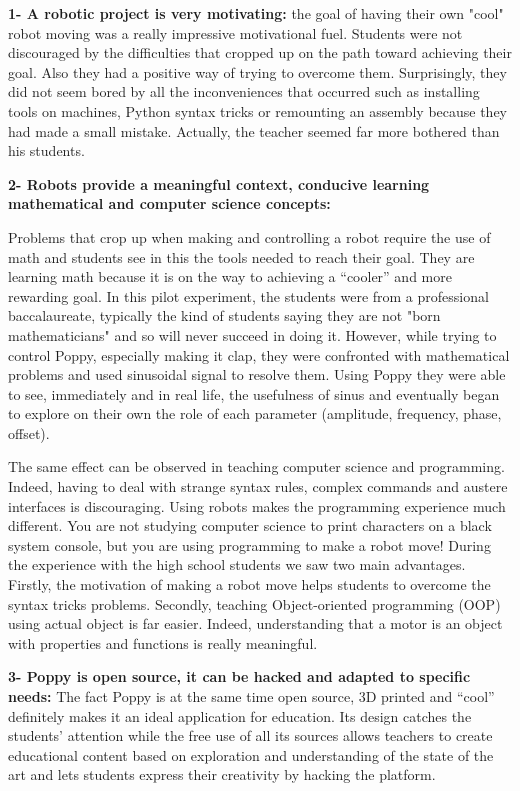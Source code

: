 \textbf{1- A robotic project is very motivating:} the goal of having their own "cool" robot moving was a really impressive motivational fuel. Students were not discouraged by the difficulties that cropped up on the path toward achieving their goal. Also they had a positive way of trying to overcome them. Surprisingly, they did not seem bored by all the inconveniences that occurred such as installing tools on machines, Python syntax tricks or remounting an assembly because they had made a small mistake. Actually, the teacher seemed far more bothered than his students.

\textbf{2- Robots provide a meaningful context, conducive learning mathematical and computer science concepts:}

Problems that crop up when making and controlling a robot require the use of math and students see in this the tools needed to reach their goal. They are learning math because it is on the way to achieving a “cooler” and more rewarding goal. In this pilot experiment, the students were from a professional baccalaureate, typically the kind of students saying they are not "born mathematicians" and so will never succeed in doing it. However, while trying to control Poppy, especially making it clap, they were confronted with mathematical problems and used sinusoidal signal to resolve them. Using Poppy they were able to see, immediately and in real life, the usefulness of sinus and eventually began to explore on their own the role of each parameter (amplitude, frequency, phase, offset).

The same effect can be observed in teaching computer science and programming. Indeed, having to deal with strange syntax rules, complex commands and austere interfaces is discouraging. Using robots makes the programming experience much different. You are not studying computer science to print characters on a black system console, but you are using programming to make a robot move!
During the experience with the high school students we saw two main advantages. Firstly, the motivation of making a robot move helps students to overcome the syntax tricks problems. Secondly, teaching Object-oriented programming (OOP) using actual object is far easier. Indeed, understanding that a motor is an object with properties and functions is really meaningful.


\textbf{3- Poppy is open source, it can be hacked and adapted to specific needs:}
The fact Poppy is at the same time open source, 3D printed and “cool” definitely makes it  an ideal application for education. Its design catches the students’ attention while the free use of all its sources allows teachers to create educational content based on exploration and understanding of the state of the art and lets students express their creativity by hacking the platform.


